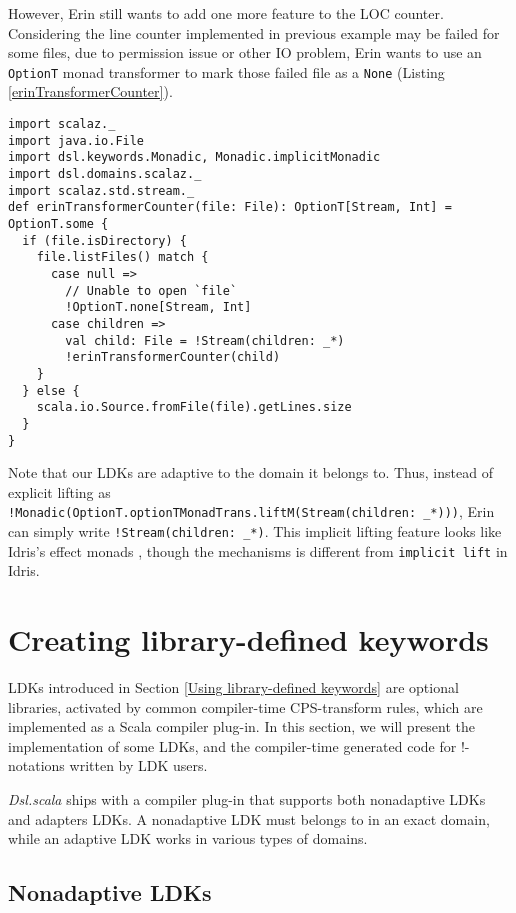 However, Erin still wants to add one more feature to the LOC counter. Considering the line counter implemented in previous example may be failed for some files,
due to permission issue or other IO problem,
Erin wants to use an \lstinline{OptionT} monad transformer to mark those failed file as a \lstinline{None} (Listing \ref{erinTransformerCounter}).

\begin{lstlisting}[caption={Erin's line of code counter, using an \lstinline{OptionT} monad transformer},label={erinTransformerCounter}]
import scalaz._
import java.io.File
import dsl.keywords.Monadic, Monadic.implicitMonadic
import dsl.domains.scalaz._
import scalaz.std.stream._
def erinTransformerCounter(file: File): OptionT[Stream, Int] = OptionT.some {
  if (file.isDirectory) {
    file.listFiles() match {
      case null =>
        // Unable to open `file`
        !OptionT.none[Stream, Int]
      case children =>
        val child: File = !Stream(children: _*)
        !erinTransformerCounter(child)
    }
  } else {
    scala.io.Source.fromFile(file).getLines.size
  }
}
\end{lstlisting}

Note that our LDKs are adaptive to the domain it belongs to. Thus, instead of explicit lifting as \lstinline{!Monadic(OptionT.optionTMonadTrans.liftM(Stream(children: _*)))}, Erin can simply write \lstinline{!Stream(children: _*)}. This implicit lifting feature looks like Idris's effect monads \cite{brady2013programming}, though the mechanisms is different from \lstinline{implicit lift} in Idris.

\section{Creating library-defined keywords}\label{Creating library-defined keywords}

LDKs introduced in Section \ref{Using library-defined keywords} are optional libraries, activated by common compiler-time CPS-transform rules, which are implemented as a Scala compiler plug-in. In this section, we will present the implementation of some LDKs, and the compiler-time generated code for !-notations written by LDK users.

\textit{Dsl.scala} ships with a compiler plug-in that supports both nonadaptive LDKs and adapters LDKs. A nonadaptive LDK must belongs to in an exact domain, while an adaptive LDK works in various types of domains.

\subsection{Nonadaptive LDKs}

